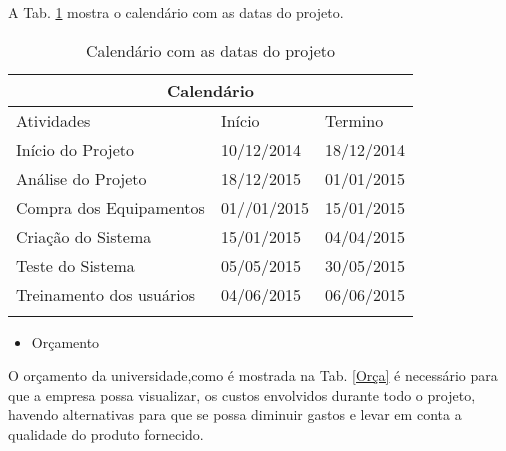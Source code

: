 A Tab. \ref{Calen} mostra o calendário com as datas do projeto.

\begin{table}[h]
\centering
\begin{tabular}{lll}
\hline
\multicolumn{3}{|c|}{Calendário}                                                                                    \\ \hline
\multicolumn{1}{|l|}{Atividades}               & \multicolumn{1}{l|}{Início}      & \multicolumn{1}{l|}{Termino}    \\ \hline
\multicolumn{1}{|l|}{Início do Projeto}        & \multicolumn{1}{l|}{10/12/2014}  & \multicolumn{1}{l|}{18/12/2014} \\ \hline
\multicolumn{1}{|l|}{Análise do Projeto}       & \multicolumn{1}{l|}{18/12/2015}  & \multicolumn{1}{l|}{01/01/2015} \\ \hline
\multicolumn{1}{|l|}{Compra dos Equipamentos}  & \multicolumn{1}{l|}{01//01/2015} & \multicolumn{1}{l|}{15/01/2015} \\ \hline
\multicolumn{1}{|l|}{Criação do Sistema}       & \multicolumn{1}{l|}{15/01/2015}  & \multicolumn{1}{l|}{04/04/2015} \\ \hline
\multicolumn{1}{|l|}{Teste do Sistema}         & \multicolumn{1}{l|}{05/05/2015}  & \multicolumn{1}{l|}{30/05/2015} \\ \hline
\multicolumn{1}{|l|}{Treinamento dos usuários} & \multicolumn{1}{l|}{04/06/2015}       & \multicolumn{1}{l|}{06/06/2015} \\ \hline
                                               &                                  &
\end{tabular}
\caption{Calendário com as datas do projeto} \label{Calen}
\end{table}

\newpage
\begin{itemize}
\centering
 \item Orçamento
\end{itemize}
O orçamento da universidade,como é mostrada na Tab. \ref{Orça} é necessário para que a empresa possa visualizar,
os custos envolvidos durante todo o projeto, havendo alternativas para que se
possa diminuir gastos e levar em conta a qualidade do produto fornecido.

